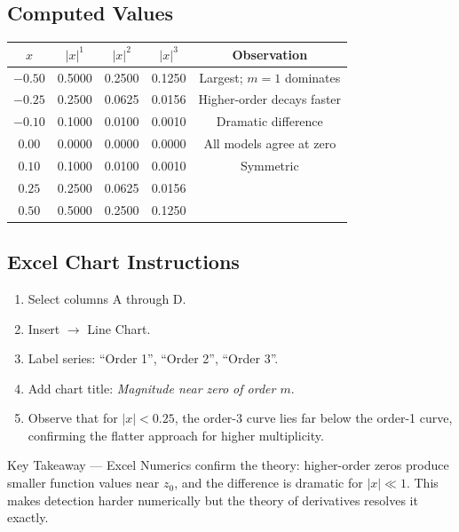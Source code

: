 \documentclass[12pt,a4paper]{article}
\begin{document}
\subsection*{Computed Values}

\begin{center}
\begin{tabular}{ccccc}
\toprule
$x$ & $|x|^1$ & $|x|^2$ & $|x|^3$ & Observation\\
\midrule
$-0.50$ & 0.5000 & 0.2500 & 0.1250 & Largest; $m=1$ dominates\\
$-0.25$ & 0.2500 & 0.0625 & 0.0156 & Higher-order decays faster\\
$-0.10$ & 0.1000 & 0.0100 & 0.0010 & Dramatic difference\\
$0.00$  & 0.0000 & 0.0000 & 0.0000 & All models agree at zero\\
$0.10$  & 0.1000 & 0.0100 & 0.0010 & Symmetric\\
$0.25$  & 0.2500 & 0.0625 & 0.0156 & \\
$0.50$  & 0.5000 & 0.2500 & 0.1250 & \\
\bottomrule
\end{tabular}
\end{center}

\subsection*{Excel Chart Instructions}

\begin{enumerate}
  \item Select columns A through D.
  \item Insert $\to$ Line Chart.
  \item Label series: ``Order 1'', ``Order 2'', ``Order 3''.
  \item Add chart title: \textit{Magnitude near zero of order $m$}.
  \item Observe that for $|x|<0.25$, the order-3 curve lies far below the order-1 curve,
        confirming the flatter approach for higher multiplicity.
\end{enumerate}

\begin{learnbox}{Key Takeaway --- Excel}
Numerics confirm the theory: higher-order zeros produce smaller function values near $z_0$,
and the difference is dramatic for $|x| \ll 1$. This makes detection harder numerically
but the theory of derivatives resolves it exactly.
\end{learnbox}
\end{document}
